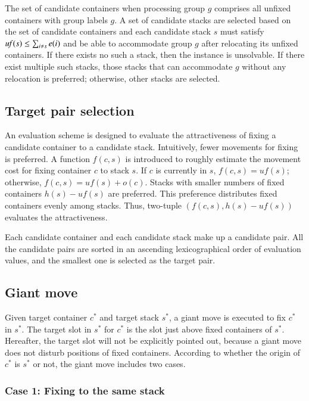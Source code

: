 \documentclass[review,3p,times,authoryear,12pt]{elsarticle}
\begin{document}
The set of candidate containers when processing group $g$ comprises all unfixed containers with group labels $g$.
A set of candidate stacks are selected based on the set of candidate containers and each candidate stack $s$ must satisfy $\id{uf}(s)\le\sum_{i\neq s}e(i)$ and be able to accommodate group $g$ after relocating its unfixed containers.
If there exists no such a stack, then the instance is unsolvable.
If there exist multiple such stacks, those stacks that can accommodate $g$ without any relocation is preferred; otherwise, other stacks are selected.

\subsection{Target pair selection}
\label{sec:tar}

An evaluation scheme is designed to evaluate the attractiveness of fixing a candidate container to a candidate stack.
Intuitively, fewer movements for fixing is preferred.
A function $f(c,s)$ is introduced to roughly estimate the movement cost for fixing container $c$ to stack $s$.
If $c$ is currently in $s$, $f(c,s)=\mathit{uf}(s)$; otherwise, $f(c,s)=\mathit{uf}(s)+o(c)$.
Stacks with smaller numbers of fixed containers $h(s)-\mathit{uf}(s)$ are preferred.
This preference distributes fixed containers evenly among stacks.
Thus, two-tuple $(f(c,s), h(s)-\mathit{uf}(s))$ evaluates the attractiveness.

Each candidate container and each candidate stack make up a candidate pair.
All the candidate pairs are sorted in an ascending lexicographical order of evaluation values, and the smallest one is selected as the target pair.

\subsection{Giant move}

Given target container $c^*$ and target stack $s^*$, a giant move is executed to fix $c^*$ in $s^*$.
The target slot in $s^*$ for $c^*$ is the slot just above fixed containers of $s^*$.
Hereafter, the target slot will not be explicitly pointed out, because a giant move does not disturb positions of fixed containers.
According to whether the origin of $c^*$ is $s^*$ or not, the giant move includes two cases.

\subsubsection{Case 1: Fixing to the same stack}
\end{document}
